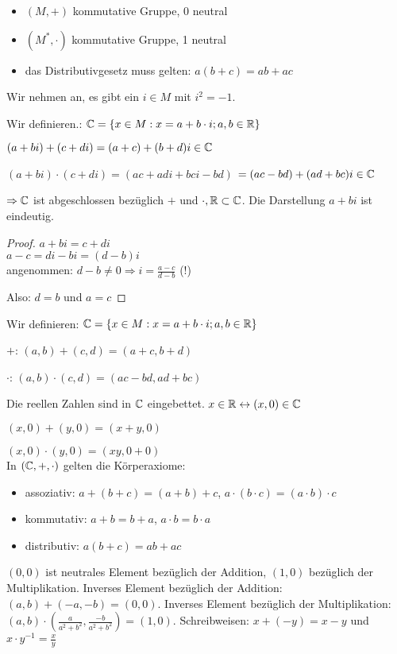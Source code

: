 \begin{itemize}
\item $(M,+)$ kommutative Gruppe, 0 neutral
\item $(M^*,\cdot)$ kommutative Gruppe, 1 neutral
\item das Distributivgesetz muss gelten: $a(b+c) = ab+ac$
\end{itemize}

Wir nehmen an, es gibt ein $i\in M$ mit $i^2=-1$.

\begin{defi}
Wir definieren.: $\mathbb{C} =  \left\lbrace x\in M: x=a+b\cdot i; a,b\in \mathbb{R} \right\rbrace $
\end{defi}

$(a+b i) + (c+d i) = (a+c) + (b+d)i \in \mathbb{C}$

$(a+b i) \cdot (c+d i) = (a c + a d i + b c i - b d)$ 
$=(ac-bd) + (ad+bc)i \in \mathbb{C}$

$\Rightarrow \mathbb{C}$ ist abgeschlossen bezüglich $+$ und $\cdot, \mathbb{R} \subset \mathbb{C}$. Die Darstellung $a+b i$ ist eindeutig. 
\begin{proof}
$a + bi = c + di$\\
$a-c = di-bi = (d-b)i$\\
angenommen: $d-b\neq 0 \Rightarrow i=\frac{a-c}{d-b}$ (!) 

Also: $d=b$ und $a=c$
\end{proof}

\begin{defi}
Wir definieren: $\mathbb{C} =  \left\lbrace x\in M: x=a+b\cdot i; a,b\in \mathbb{R} \right\rbrace $

\textbf{$+$}: $(a,b)+(c,d)=(a+c,b+d)$

\textbf{$\cdot$}: $(a,b)\cdot (c,d)=(a c - bd,ad+bc)$
\end{defi}

Die reellen Zahlen sind in $\mathbb{C}$ eingebettet. 
$x\in \mathbb{R} \leftrightarrow (x,0) \in \mathbb{C}$

$(x,0) + (y,0) = (x+y,0)$

$(x,0) \cdot (y,0) = (xy,0+0)$\\

In $(\mathbb{C},+,\cdot)$ gelten die Körperaxiome:
\begin{itemize}
\item assoziativ: $a+(b+c)=(a+b)+c$, $a\cdot (b\cdot c)=(a\cdot b)\cdot c$
\item kommutativ: $a+b=b+a$, $a\cdot b=b\cdot a$
\item distributiv: $a (b+c)= ab+ac$
\end{itemize}

$(0,0)$ ist neutrales Element bezüglich der Addition, $(1,0)$ bezüglich der Multiplikation. Inverses Element bezüglich der Addition: $(a,b)+(-a,-b)=(0,0)$. Inverses Element bezüglich der Multiplikation: $(a,b)\cdot (\frac{a}{a^2+b^2},\frac{-b}{a^2+b^2})=(1,0)$. 
Schreibweisen: $x+(-y) = x-y$ und $x\cdot y^{-1} = \frac{x}{y}$
